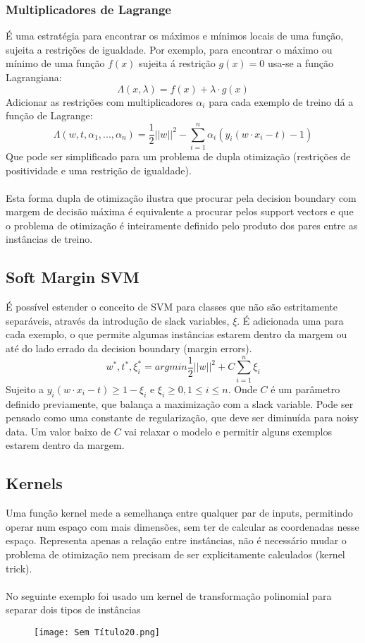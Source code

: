 \documentclass[10pt,a4paper]{report}
\begin{document}
\subsubsection{Multiplicadores de Lagrange}
É uma estratégia para encontrar os máximos e mínimos locais de uma função, sujeita a restrições de igualdade. Por exemplo, para encontrar o máximo ou mínimo de uma função $f(x)$ sujeita á restrição $g(x) = 0$ usa-se a função Lagrangiana:
$$
\Lambda (x, \lambda) = f(x) + \lambda \cdot g(x)
$$
Adicionar as restrições com multiplicadores $\alpha_i$ para cada exemplo de treino dá a função de Lagrange:
$$
\Lambda(w, t, \alpha_1,...,\alpha_n) = \frac{1}{2  } ||w||^2 - \sum_{i=1}^n \alpha_i(y_i(w \cdot x_i - t) - 1)
$$
Que pode ser simplificado para um problema de dupla otimização (restrições de positividade e uma restrição de igualdade).\\
\\
Esta forma dupla de otimização ilustra que procurar pela decision boundary com margem de decisão máxima é equivalente a procurar pelos support vectors e que o problema de otimização é inteiramente definido pelo produto dos pares entre as instâncias de treino.
\subsection{Soft Margin SVM}
É possível estender o conceito de SVM para classes que não são estritamente separáveis, através da introdução de slack variables, $\xi$. É adicionada uma para cada exemplo, o que permite algumas instâncias estarem dentro da margem ou até do lado errado da decision boundary (margin errors).
$$
w^*,t^*,\xi_i^* = argmin \frac{1}{2} ||w||^2 + C \sum_{i=1}^n \xi_i
$$
Sujeito a $y_i(w \cdot x_i - t) \geq 1 - \xi_i$ e $\xi_i \geq 0, 1 \leq i \leq n$. Onde $C$ é um parâmetro definido previamente, que balança a maximização com a slack variable. Pode ser pensado como uma constante de regularização, que deve ser diminuída para noisy data. Um valor baixo de $C$ vai relaxar o modelo e permitir alguns exemplos estarem dentro da margem.
\subsection{Kernels}
Uma função kernel mede a semelhança entre qualquer par de inputs, permitindo operar num espaço com mais dimensões, sem ter de calcular as coordenadas nesse espaço. Representa apenas a relação entre instâncias, não é necessário mudar o problema de otimização nem precisam de ser explicitamente calculados (kernel trick).\\
\\
No seguinte exemplo foi usado um kernel de transformação polinomial para separar dois tipos de instâncias
\begin{figure}[H]
\centering
\texttt{[image: Sem Título20.png]}
\end{figure}
\end{document}
